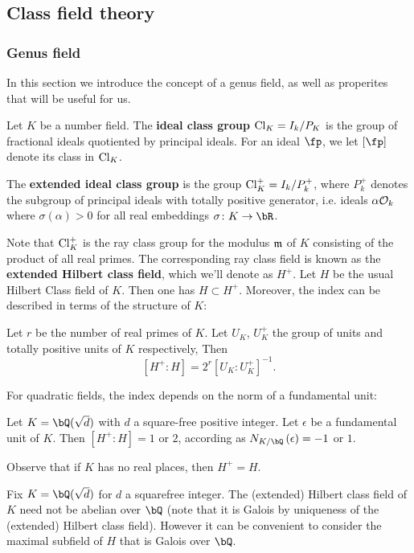\subsection{Class field theory}
\subsubsection{Genus field}

In this section we introduce the concept of a genus field, as well as properites that will be useful for us.

Let $K$ be a number field. The \textbf{ideal class group} $\mathrm{Cl}_K = I_k / P_K$ is the group of fractional ideals quotiented by principal ideals.
For an ideal $\fp$, we let $[\fp]$ denote its class in $\mathrm{Cl}_K$.

The \textbf{extended ideal class group} is the group $\mathrm{Cl}_K^{+} = I_k / P_k^{+}$, where
$P_k^{+}$ denotes the subgroup of principal ideals with totally positive generator, i.e. ideals $\alpha \mathcal{O}_k$ where $\sigma(\alpha) > 0$ for all real embeddings $\sigma \colon K \to \bR$.

Note that $\mathrm{Cl}_K^{+}$ is the ray class group for the modulus $\mathfrak{m}$ of $K$ consisting of the product of all real primes. The corresponding ray class field is known as the \textbf{extended Hilbert class field}, which we'll denote as $H^{+}$. Let $H$ be the usual Hilbert Class field of $K$. Then one has $H \subset H^{+}$. Moreover, the index can be described in terms of the structure of $K$:

\begin{thm}
    Let $r$ be the number of real primes of $K$. Let $U_K$, $U_K^{+}$ the group of units and totally positive units of $K$ respectively, Then 
    \[ [H^{+} \colon H] = 2^r [U_K \colon U_K^{+}]^{-1} .\]
\end{thm}
For quadratic fields, the index depends on the norm of a fundamental unit:

\begin{cor}
    Let $K = \bQ(\sqrt{d})$ with $d$ a square-free positive integer. Let $\epsilon$ be a fundamental unit of $K$. Then $[H^{+} \colon H] = 1$ or $2$, according as $N_{K / \bQ}\left(\epsilon\right) = -1$ or $1$. 
\end{cor}
Observe that if $K$ has no real places, then $H^{+} = H$.

Fix $K = \bQ(\sqrt{d})$ for $d$ a squarefree integer. The (extended) Hilbert class field of $K$ need not be abelian over $\bQ$ (note that it is Galois by uniqueness of the (extended) Hilbert class field). However it can be convenient to consider the maximal subfield of $H$ that is Galois over $\bQ$. 

